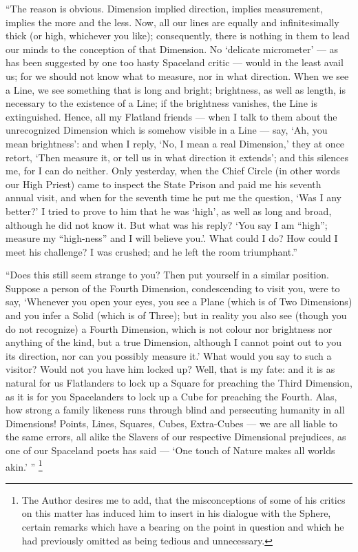 \documentclass[12pt, a4paper, oneside]{memoir}
\begin{document}
``The reason is obvious. Dimension implied direction, implies measurement,
implies the more and the less. Now, all our lines are equally and
infinitesimally thick (or high, whichever you like); consequently, there is
nothing in them to lead our minds to the conception of that Dimension. No
`delicate micrometer' --- as has been suggested by one too hasty Spaceland
critic --- would in the least avail us; for we should not know what to measure,
nor in what direction. When we see a Line, we see something that is long and
bright; brightness, as well as length, is necessary to the existence of a
Line; if the brightness vanishes, the Line is extinguished. Hence, all my
Flatland friends --- when I talk to them about the unrecognized Dimension which
is somehow visible in a Line --- say, `Ah, you mean brightness': and when I
reply, `No, I mean a real Dimension,' they at once retort, `Then measure it,
or tell us in what direction it extends'; and this silences me, for I can do
neither. Only yesterday, when the Chief Circle (in other words our High
Priest) came to inspect the State Prison and paid me his seventh annual visit,
and when for the seventh time he put me the question, `Was I any better?' I
tried to prove to him that he was `high', as well as long and broad, although
he did not know it. But what was his reply? `You say I am ``high''; measure my
``high-ness'' and I will believe you.'. What could I do? How could I meet his
challenge? I was crushed; and he left the room triumphant.''

``Does this still seem strange to you? Then put yourself in a similar position.
Suppose a person of the Fourth Dimension, condescending to visit you, were to
say, `Whenever you open your eyes, you see a Plane (which is of Two
Dimensions) and you infer a Solid (which is of Three); but in reality you also
see (though you do not recognize) a Fourth Dimension, which is not colour nor
brightness nor anything of the kind, but a true Dimension, although I cannot
point out to you its direction, nor can you possibly measure it.' What would
you say to such a visitor? Would not you have him locked up? Well, that is my
fate: and it is as natural for us Flatlanders to lock up a Square for
preaching the Third Dimension, as it is for you Spacelanders to lock up a Cube
for preaching the Fourth. Alas, how strong a family likeness runs through
blind and persecuting humanity in all Dimensions! Points, Lines, Squares,
Cubes, Extra-Cubes --- we are all liable to the same errors, all alike the
Slavers of our respective Dimensional prejudices, as one of our Spaceland
poets has said --- `One touch of Nature makes all worlds akin.' '' \footnote{The
Author desires me to add, that the misconceptions of some of his critics on
this matter has induced him to insert in his dialogue with
the Sphere, certain remarks which have a bearing on the point in question and
which he had previously omitted as being tedious and unnecessary.}
\end{document}
